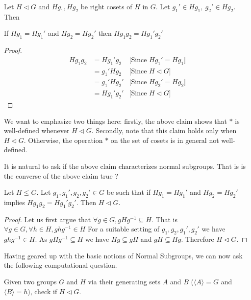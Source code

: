 \begin{claim}
Let $H\triangleleft G$ and $Hg_1,Hg_2$ be right cosets of $H$ in $G$. Let $g_1'\in Hg_1,~g_2'\in Hg_2$. Then 
\begin{center}
If $Hg_1=Hg_1'$ and $Hg_2=Hg_2'$ then $Hg_1g_2 = Hg_1'g_2' $
\end{center} 
\end{claim}
\begin{proof}
\begin{eqnarray*}
Hg_1g_2 &= Hg_1'g_2  & \text{[Since $Hg_1'= Hg_1$]}\\
&= g_1'Hg_2 & \text{[Since $H\triangleleft G$]}\\
&= g_1'Hg_2' & \text{[Since $Hg_2'= Hg_2$]}\\
&= Hg_1'g_2' & \text{[Since $H\triangleleft G$]}
\end{eqnarray*}
\end{proof}

We want to emphasize two things here: firstly, the above claim shows that $*$ is well-defined whenever $H\triangleleft G$. Secondly, note that this claim holds only when $H\triangleleft G$. Otherwise, the operation $*$ on the set of cosets is in general not well-defined. 

It is natural to ask if the above claim characterizes normal subgroups. That is is the converse of the above claim true ? 

\begin{claim}
Let $H\leq G$. Let $g_1,g_1',g_2,g_2'\in G$ be such that if $Hg_1=Hg_1'$ and $Hg_2=Hg_2'$ implies $Hg_1g_2 = Hg_1'g_2'$. Then $H\triangleleft G$.
\end{claim}
\begin{proof}
Let us first argue that $\forall g\in G, gHg^{-1}\subseteq H$. That is $\forall g\in G,\forall h\in H,  ghg^{-1}\in H$
For a suitable setting of $g_1,g_2,g_1',g_2'$ we have $ghg^{-1}\in H$. As $gHg^{-1}\subseteq H$ we have $Hg\subseteq gH$ and $gH\subseteq Hg$. Therefore $H\triangleleft G$.
\end{proof}
Having geared up with the basic notions of Normal Subgroups, we can now ask the following computational question.
\begin{problem}\label{2}
	Given two groups $G$ and $H$ via their generating sets $A$ and $B$ ($\langle A\rangle=G$ and $\langle B\rangle=h$), check if $H\triangleleft G$.
\end{problem}
